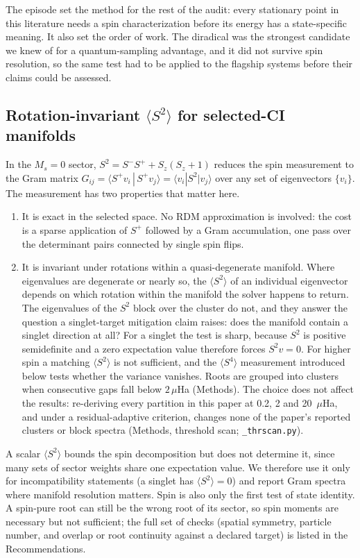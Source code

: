 \documentclass[11pt]{article}
\newcommand{\ssq}{\ensuremath{\langle S^2\rangle}}
\begin{document}
The episode set the method for the rest of the audit: every stationary point in this literature needs a spin characterization before its energy has a state-specific meaning. It also set the order of work. The diradical was the strongest candidate we knew of for a quantum-sampling advantage, and it did not survive spin resolution, so the same test had to be applied to the flagship systems before their claims could be assessed.

\subsection{Rotation-invariant \texorpdfstring{\ssq}{<S2>} for selected-CI manifolds}\label{sec:instrument}

In the $M_s=0$ sector, $S^2 = S^-S^+ + S_z(S_z+1)$ reduces the spin measurement to the Gram matrix $G_{ij} = \langle S^+ v_i \,|\, S^+ v_j\rangle = \langle v_i | S^2 | v_j \rangle$ over any set of eigenvectors $\{v_i\}$. The measurement has two properties that matter here.
\begin{enumerate}
\item It is exact in the selected space. No RDM approximation is involved: the cost is a sparse application of $S^+$ followed by a Gram accumulation, one pass over the determinant pairs connected by single spin flips.
\item It is invariant under rotations within a quasi-degenerate manifold. Where eigenvalues are degenerate or nearly so, the \ssq{} of an individual eigenvector depends on which rotation within the manifold the solver happens to return. The eigenvalues of the $S^2$ block over the cluster do not, and they answer the question a singlet-target mitigation claim raises: does the manifold contain a singlet direction at all? For a singlet the test is sharp, because $S^2$ is positive semidefinite and a zero expectation value therefore forces $S^2 v = 0$. For higher spin a matching \ssq{} is not sufficient, and the $\langle S^4\rangle$ measurement introduced below tests whether the variance vanishes. Roots are grouped into clusters when consecutive gaps fall below $2\,\mu$Ha (Methods). The choice does not affect the results: re-deriving every partition in this paper at 0.2, 2 and 20~$\mu$Ha, and under a residual-adaptive criterion, changes none of the paper's reported clusters or block spectra (Methods, threshold scan; \texttt{\_thrscan.py}).
\end{enumerate}
A scalar \ssq{} bounds the spin decomposition but does not determine it, since many sets of sector weights share one expectation value. We therefore use it only for incompatibility statements (a singlet has $\ssq = 0$) and report Gram spectra where manifold resolution matters. Spin is also only the first test of state identity. A spin-pure root can still be the wrong root of its sector, so spin moments are necessary but not sufficient; the full set of checks (spatial symmetry, particle number, and overlap or root continuity against a declared target) is listed in the Recommendations.
\end{document}
